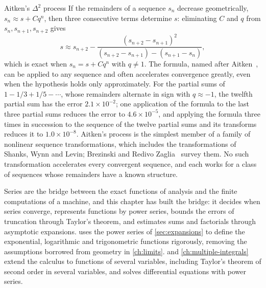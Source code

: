 \begin{note}{Aitken's \texorpdfstring{$\Delta^2$}{Delta-squared} process}
If the remainders of a sequence $s_n$ decrease geometrically, $s_n\approx s+Cq^n$, then three consecutive terms determine $s$: eliminating $C$ and $q$ from $s_n,s_{n+1},s_{n+2}$ gives
\[
s\approx s_{n+2}-\frac{(s_{n+2}-s_{n+1})^2}{(s_{n+2}-s_{n+1})-(s_{n+1}-s_n)} ,
\]
which is exact when $s_n=s+Cq^n$ with $q\ne1$. The formula, named after Aitken~\cite{aitken1926}, can be applied to any sequence and often accelerates convergence greatly, even when the hypothesis holds only approximately. For the partial sums of $1-1/3+1/5-\cdots$, whose remainders alternate in sign with $q\approx-1$, the twelfth partial sum has the error $2.1\times10^{-2}$; one application of the formula to the last three partial sums reduces the error to $4.6\times10^{-5}$, and applying the formula three times in succession to the sequence of the twelve partial sums and its transforms reduces it to $1.0\times10^{-8}$. Aitken's process is the simplest member of a family of nonlinear sequence transformations, which includes the transformations of Shanks, Wynn and Levin; Brezinski and Redivo Zaglia~\cite{brezinski1991} survey them. No such transformation accelerates every convergent sequence, and each works for a class of sequences whose remainders have a known structure.
\end{note}

\bigskip
Series are the bridge between the exact functions of analysis and the finite computations of a machine, and this chapter has built the bridge: it decides when series converge, represents functions by power series, bounds the errors of truncation through Taylor's theorem, and estimates sums and factorials through asymptotic expansions.  uses the power series of \cref{sec:expansions} to define the exponential, logarithmic and trigonometric functions rigorously, removing the assumptions borrowed from geometry in \cref{ch:limits}.  and \cref{ch:multiple-integrals} extend the calculus to functions of several variables, including Taylor's theorem of second order in several variables, and  solves differential equations with power series.

\chapternotes

